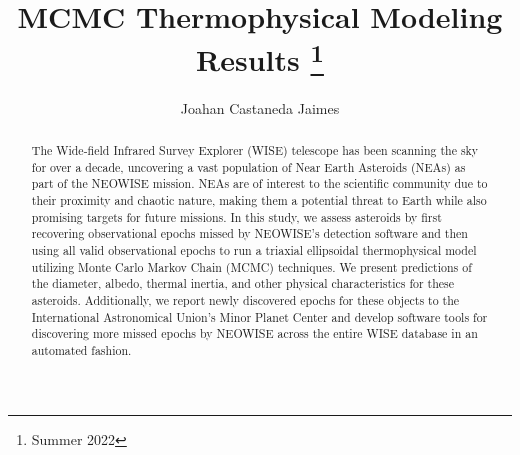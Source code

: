 \documentclass[linenumbers]{aastex631}
\begin{document}
\title{MCMC Thermophysical Modeling Results \footnote{Summer 2022}}
\author{Joahan Castaneda Jaimes}
\begin{abstract}
The Wide-field Infrared Survey Explorer (WISE) telescope has been scanning the sky for over a decade, uncovering a vast population of Near Earth Asteroids (NEAs) as part of the NEOWISE mission. NEAs are of interest to the scientific community due to their proximity and chaotic nature, making them a potential threat to Earth while also promising targets for future missions. In this study, we assess asteroids by first recovering observational epochs missed by NEOWISE’s detection software and then using all valid observational epochs to run a triaxial ellipsoidal thermophysical model utilizing Monte Carlo Markov Chain (MCMC) techniques. We present predictions of the diameter, albedo, thermal inertia, and other physical characteristics for these asteroids. Additionally, we report newly discovered epochs for these objects to the International Astronomical Union’s Minor Planet Center and develop software tools for discovering more missed epochs by NEOWISE across the entire WISE database in an automated fashion.
\end{abstract}
\end{document}
